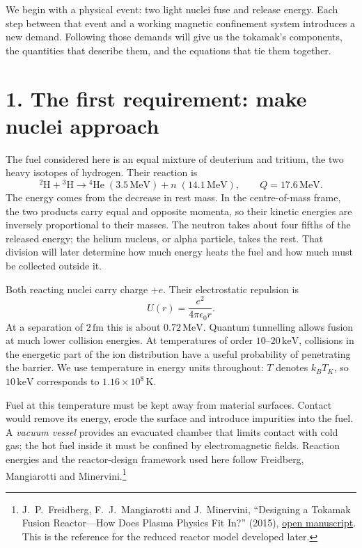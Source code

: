 \documentclass[11pt]{article}
\begin{document}
We begin with a physical event: two light nuclei fuse and release energy. Each step
between that event and a working magnetic confinement system introduces a new demand.
Following those demands will give us the tokamak's components, the quantities that
describe them, and the equations that tie them together.

\section*{1. The first requirement: make nuclei approach}
The fuel considered here is an equal mixture of deuterium and tritium, the two heavy
isotopes of hydrogen. Their reaction is
\begin{equation}
 {}^{2}\mathrm H+{}^{3}\mathrm H\longrightarrow{}^{4}\mathrm{He}\;(3.5\,\mathrm{MeV})
 +n\;(14.1\,\mathrm{MeV}),\qquad Q=17.6\,\mathrm{MeV}.
 \label{eq:dt}
\end{equation}
The energy comes from the decrease in rest mass. In the centre-of-mass frame, the two
products carry equal and opposite momenta, so their kinetic energies are inversely
proportional to their masses. The neutron takes about four fifths of the released
energy; the helium nucleus, or alpha particle, takes the rest. That division will
later determine how much energy heats the fuel and how much must be collected outside it.

Both reacting nuclei carry charge $+e$. Their electrostatic repulsion is
\begin{equation}
 U(r)=\frac{e^2}{4\pi\epsilon_0r}.
 \label{eq:coulomb}
\end{equation}
At a separation of $2\,\mathrm{fm}$ this is about $0.72\,\mathrm{MeV}$. Quantum
tunnelling allows fusion at much lower collision energies. At temperatures of order
$10$--$20\,\mathrm{keV}$, collisions in the energetic part of the ion distribution
have a useful probability of penetrating the barrier. We use temperature in energy
units throughout: $T$ denotes $k_BT_K$, so $10\,\mathrm{keV}$ corresponds to
$1.16\times10^8\,\mathrm K$.

Fuel at this temperature must be kept away from material surfaces. Contact would
remove its energy, erode the surface and introduce impurities into the fuel. A
\emph{vacuum vessel} provides an evacuated chamber that limits contact with cold gas;
the hot fuel inside it must be confined by electromagnetic fields. Reaction energies
and the reactor-design framework used here follow Freidberg, Mangiarotti and
Minervini.\footnote{J.~P.~Freidberg, F.~J.~Mangiarotti and J.~Minervini,
``Designing a Tokamak Fusion Reactor---How Does Plasma Physics Fit In?'' (2015),
\href{https://library.psfc.mit.edu/catalog/reports/2010/15ja/15ja021/15ja021_full.pdf}{open manuscript}.
This is the reference for the reduced reactor model developed later.}
\end{document}
